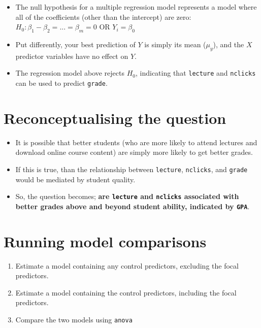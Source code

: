 \documentclass[
]{article}
\providecommand{\tightlist}{%
  \setlength{\itemsep}{0pt}\setlength{\parskip}{0pt}}
\begin{document}
\begin{itemize}
\tightlist
\item
  The null hypothesis for a multiple regression model represents a model
  where all of the coefficients (other than the intercept) are zero:
  \(H_0 : \beta_1 - \beta_2 = ... = \beta_m = 0\) OR \(Y_i = \beta_0\)
\item
  Put differently, your best prediction of \(Y\) is simply its mean
  (\(\mu_y\)), and the \(X\) predictor variables have no effect on
  \(Y\).
\item
  The regression model above rejects \(H_0\), indicating that
  \texttt{lecture} and \texttt{nclicks} can be used to predict
  \texttt{grade}.
\end{itemize}

\hypertarget{reconceptualising-the-question}{%
\section{Reconceptualising the
question}\label{reconceptualising-the-question}}

\begin{itemize}
\tightlist
\item
  It is possible that better students (who are more likely to attend
  lectures and download online course content) are simply more likely to
  get better grades.
\item
  If this is true, than the relationship between \texttt{lecture},
  \texttt{nclicks}, and \texttt{grade} would be mediated by student
  quality.
\item
  So, the question becomes; \textbf{are \texttt{lecture} and
  \texttt{nclicks} associated with better grades above and beyond
  student ability, indicated by \texttt{GPA}}.
\end{itemize}

\hypertarget{running-model-comparisons}{%
\section{Running model comparisons}\label{running-model-comparisons}}

\begin{enumerate}
\def\labelenumi{\arabic{enumi}.}
\tightlist
\item
  Estimate a model containing any control predictors, excluding the
  focal predictors.
\item
  Estimate a model containing the control predictors, including the
  focal predictors.
\item
  Compare the two models using \texttt{anova}
\end{enumerate}
\end{document}
